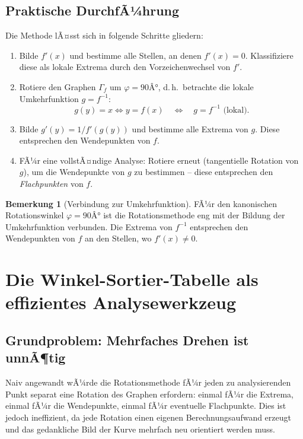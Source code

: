 ﻿\documentclass[12pt, a4paper]{article}
\theoremstyle{definition}
\newtheorem{bemerkung}{Bemerkung}[section]
\begin{document}
	\subsection{Praktische DurchfÃ¼hrung}
	
	Die Methode lÃ¤sst sich in folgende Schritte gliedern:
	
	\begin{enumerate}[label=\textbf{Schritt \arabic*:}]
		\item Bilde $f'(x)$ und bestimme alle Stellen, an denen $f'(x) = 0$.
		Klassifiziere diese als lokale Extrema durch den Vorzeichenwechsel von $f'$.
		
		\item Rotiere den Graphen $\Gamma_f$ um $\varphi = 90Â°$, d.\,h.\ betrachte
		die lokale Umkehrfunktion $g = f^{-1}$:
		\[
		g(y) = x \iff y = f(x)
		\quad \Longleftrightarrow \quad
		g = f^{-1} \text{ (lokal)}.
		\]
		
		\item Bilde $g'(y) = 1/f'(g(y))$ und bestimme alle Extrema von $g$.
		Diese entsprechen den Wendepunkten von $f$.
		
		\item FÃ¼r eine vollstÃ¤ndige Analyse: Rotiere erneut (tangentielle Rotation
		von $g$), um die Wendepunkte von $g$ zu bestimmen -- diese
		entsprechen den \emph{Flachpunkten} von $f$.
	\end{enumerate}
	
	\begin{bemerkung}[Verbindung zur Umkehrfunktion]
		FÃ¼r den kanonischen Rotationswinkel $\varphi = 90Â°$ ist die Rotationsmethode
		eng mit der Bildung der Umkehrfunktion verbunden. Die Extrema von $f^{-1}$
		entsprechen den Wendepunkten von $f$ an den Stellen, wo $f'(x) \neq 0$.
	\end{bemerkung}
	
	\section{Die Winkel-Sortier-Tabelle als effizientes Analysewerkzeug}
	
	\subsection{Grundproblem: Mehrfaches Drehen ist unnÃ¶tig}
	
	Naiv angewandt wÃ¼rde die Rotationsmethode fÃ¼r jeden zu analysierenden
	Punkt separat eine Rotation des Graphen erfordern: einmal fÃ¼r die Extrema,
	einmal fÃ¼r die Wendepunkte, einmal fÃ¼r eventuelle Flachpunkte. Dies ist
	jedoch ineffizient, da jede Rotation einen eigenen Berechnungsaufwand
	erzeugt und das gedankliche Bild der Kurve mehrfach neu orientiert werden muss.
	
\end{document}
